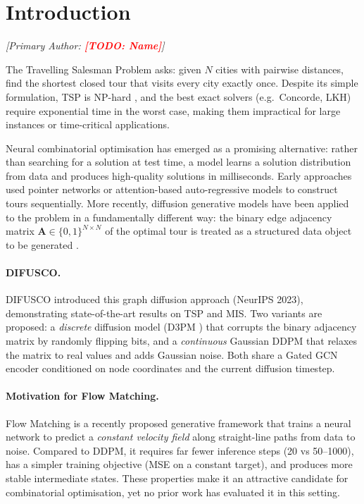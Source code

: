 \documentclass[11pt,a4paper]{article}
\newcommand{\TODO}[1]{\textcolor{red}{\textbf{[TODO: #1]}}}
\begin{document}
\section{Introduction}
\label{sec:intro}
\textit{[Primary Author: \TODO{Name}]}

The Travelling Salesman Problem asks: given $N$ cities with pairwise distances, find the
shortest closed tour that visits every city exactly once. Despite its simple formulation,
TSP is NP-hard \citep{garey1979computers}, and the best exact solvers (e.g.\ Concorde, LKH)
require exponential time in the worst case, making them impractical for large instances or
time-critical applications.

Neural combinatorial optimisation has emerged as a promising alternative: rather than
searching for a solution at test time, a model learns a solution distribution from data and
produces high-quality solutions in milliseconds. Early approaches used
pointer networks \citep{vinyals2015pointer} or attention-based auto-regressive models
\citep{kool2019attention} to construct tours sequentially. More recently, diffusion
generative models have been applied to the problem in a fundamentally different way:
the binary edge adjacency matrix $\mathbf{A} \in \{0,1\}^{N \times N}$ of the optimal tour
is treated as a structured data object to be generated \citep{sun2023difusco}.

\paragraph{DIFUSCO.}
DIFUSCO \citep{sun2023difusco} introduced this graph diffusion approach (NeurIPS 2023),
demonstrating state-of-the-art results on TSP and MIS. Two variants are proposed: a
\emph{discrete} diffusion model (D3PM \citep{austin2021d3pm}) that corrupts the binary
adjacency matrix by randomly flipping bits, and a \emph{continuous} Gaussian DDPM that
relaxes the matrix to real values and adds Gaussian noise. Both share a Gated GCN encoder
conditioned on node coordinates and the current diffusion timestep.

\paragraph{Motivation for Flow Matching.}
Flow Matching \citep{lipman2022flow} is a recently proposed generative framework that trains
a neural network to predict a \emph{constant velocity field} along straight-line paths from
data to noise. Compared to DDPM, it requires far fewer inference steps (20 vs 50--1000),
has a simpler training objective (MSE on a constant target), and produces more stable
intermediate states. These properties make it an attractive candidate for combinatorial
optimisation, yet no prior work has evaluated it in this setting.
\end{document}
